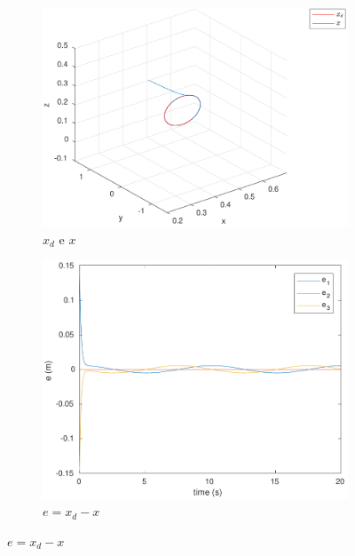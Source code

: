 \documentclass[a4paper,11pt]{article}
\theoremstyle{mytheor}
\begin{document}
\begin{figure}[!ht]
\centering
  \begin{minipage}{\linewidth}
  \centering
    \begin{subfigure}[b]{0.4\textwidth}
    \includegraphics[width=1\textwidth]{figs/ex1_b_2_x.pdf}
    \caption{$x_d$ e $x$}
    \label{fig:ex1_b_2_x}
    \end{subfigure}
  \end{minipage}
  \begin{minipage}{\linewidth}
  \centering
    \begin{subfigure}[b]{0.4\textwidth}
    \includegraphics[width=1\textwidth]{figs/ex1_b_2_e.pdf}
    \caption{$e = x_d - x$}
    \label{fig:ex1_b_2_e}

\end{subfigure}
\end{minipage}
\end{figure}
\end{document}
